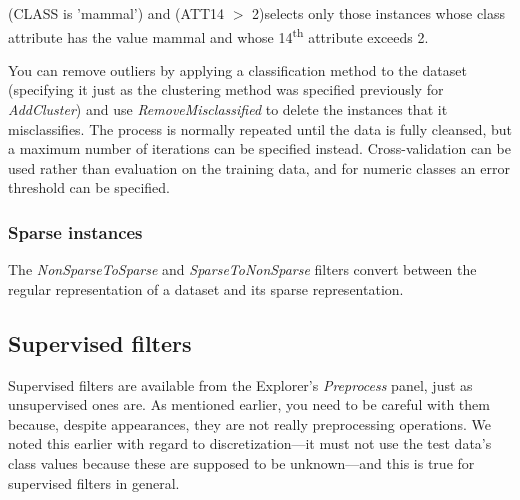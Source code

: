 (CLASS is 'mammal') and (ATT14 $>$ 2)\newline \newline selects only those instances whose class attribute has the value
mammal and whose 14\textsuperscript{th} attribute exceeds 2.

You can remove outliers by applying a classification method to the
dataset (specifying it just as the clustering method was specified
previously for \textit{AddCluster}) and use
\textit{RemoveMisclassified} to delete the instances that it
misclassifies. The process is normally repeated until the data is
fully cleansed, but a maximum number of iterations can be specified
instead. Cross-validation can be used rather than evaluation on the
training data, and for numeric classes an error threshold can be
specified.

\subsubsection{Sparse instances}

The \textit{NonSparseToSparse} and \textit{SparseToNonSparse} filters
convert between the regular representation of a dataset and its sparse
representation.

\subsection{Supervised filters}
\label{subsection:supervised_filters}

Supervised filters are available from the Explorer's
\textit{Preprocess} panel, just as unsupervised ones are. As mentioned
earlier, you need to be careful with them because, despite
appearances, they are not really preprocessing operations. We noted
this earlier with regard to discretization---it must
not use the test data's class values because these are supposed to be
unknown---and this is true for supervised filters in general.

